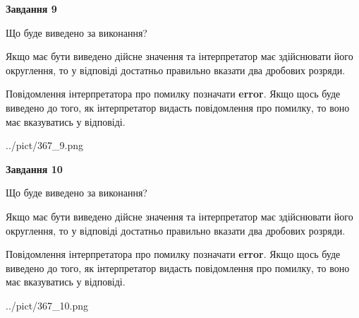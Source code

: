 \documentclass[12pt, ukrainian]{article}
\begin{document}
{\begin {Large}
{\begin {center}\textbf{Завдання 9}\end {center}}\par
Що буде виведено за виконання? \par

Якщо має бути виведено дійсне значення та інтерпретатор має здійснювати його округлення, 
то у відповіді достатньо правильно вказати два дробових розряди.

Повідомлення інтерпретатора про помилку позначати \textbf{error}.
Якщо щось буде виведено до того, як інтерпретатор видасть повідомлення про помилку, 
то воно має вказуватись у відповіді. \par

\begin{center}
	{../pict/367_9.png}
\end{center}
\newpage

{\begin {center}\textbf{Завдання 10}\end {center}}\par
Що буде виведено за виконання? \par

Якщо має бути виведено дійсне значення та інтерпретатор має здійснювати його округлення, 
то у відповіді достатньо правильно вказати два дробових розряди.

Повідомлення інтерпретатора про помилку позначати \textbf{error}.
Якщо щось буде виведено до того, як інтерпретатор видасть повідомлення про помилку, 
то воно має вказуватись у відповіді. \par

\begin{center}
	{../pict/367_10.png}
\end{center}
\newpage

\end {Large}}
\end{document}
